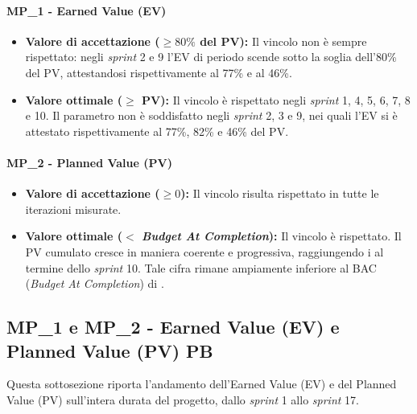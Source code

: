 \documentclass[12pt, a4paper]{article}
\begin{document}
\paragraph*{MP\_1 - Earned Value (EV)}
\begin{itemize}
    \item \textbf{Valore di accettazione ($\ge 80\%$ del PV):} Il vincolo non è sempre rispettato: negli \textit{sprint} 2 e 9 l'EV di periodo scende sotto la soglia dell'80\% del PV, attestandosi rispettivamente al 77\% e al 46\%.
    \item \textbf{Valore ottimale ($\ge$ PV):} Il vincolo è rispettato negli \textit{sprint} 1, 4, 5, 6, 7, 8 e 10. Il parametro non è soddisfatto negli \textit{sprint} 2, 3 e 9, nei quali l'EV si è attestato rispettivamente al 77\%, 82\% e 46\% del PV.
\end{itemize}

\paragraph*{MP\_2 - Planned Value (PV)}
\begin{itemize}
    \item \textbf{Valore di accettazione ($\ge 0$):} Il vincolo risulta rispettato in tutte le iterazioni misurate.
    \item \textbf{Valore ottimale ($<$ \textit{Budget At Completion}):} Il vincolo è rispettato. Il PV cumulato cresce in maniera coerente e progressiva, raggiungendo i  al termine dello \textit{sprint} 10. Tale cifra rimane ampiamente inferiore al BAC (\textit{Budget At Completion}) di .
\end{itemize}

\subsection{MP\_1 e MP\_2 - Earned Value (EV) e Planned Value (PV) PB}
Questa sottosezione riporta l'andamento dell'Earned Value (EV) e del Planned Value (PV) sull'intera durata del progetto, dallo \textit{sprint} 1 allo \textit{sprint} 17.
\end{document}
